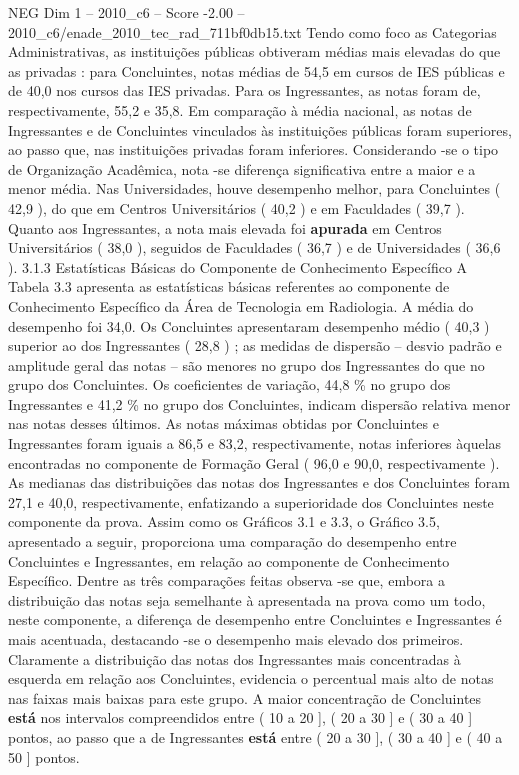 \begin{textsample}{NEG Dim 1 – 2010\_c6 – Score -2.00 – 2010\_c6/enade\_2010\_tec\_rad\_711bf0db15.txt}
Tendo como foco as Categorias Administrativas, as instituições públicas obtiveram médias mais elevadas do que as privadas : para Concluintes, notas médias de 54,5 em cursos de IES públicas e de 40,0 nos cursos das IES privadas.
Para os Ingressantes, as notas foram de, respectivamente, 55,2 e 35,8.
Em comparação à média nacional, as notas de Ingressantes e de Concluintes vinculados às instituições públicas foram superiores, ao passo que, nas instituições privadas foram inferiores.
Considerando -se o tipo de Organização Acadêmica, nota -se diferença significativa entre a maior e a menor média.
Nas Universidades, houve desempenho melhor, para Concluintes ( 42,9 ), do que em Centros Universitários ( 40,2 ) e em Faculdades ( 39,7 ).
Quanto aos Ingressantes, a nota mais elevada foi \textbf{apurada} em Centros Universitários ( 38,0 ), seguidos de Faculdades ( 36,7 ) e de Universidades ( 36,6 ). 3.1.3 Estatísticas Básicas do Componente de Conhecimento Específico A Tabela 3.3 apresenta as estatísticas básicas referentes ao componente de Conhecimento Específico da Área de Tecnologia em Radiologia.
A média do desempenho foi 34,0.
Os Concluintes apresentaram desempenho médio ( 40,3 ) superior ao dos Ingressantes ( 28,8 ) ; as medidas de dispersão – desvio padrão e amplitude geral das notas – são menores no grupo dos Ingressantes do que no grupo dos Concluintes.
Os coeficientes de variação, 44,8 \% no grupo dos Ingressantes e 41,2 \% no grupo dos Concluintes, indicam dispersão relativa menor nas notas desses últimos.
As notas máximas obtidas por Concluintes e Ingressantes foram iguais a 86,5 e 83,2, respectivamente, notas inferiores àquelas encontradas no componente de Formação Geral ( 96,0 e 90,0, respectivamente ).
As medianas das distribuições das notas dos Ingressantes e dos Concluintes foram 27,1 e 40,0, respectivamente, enfatizando a superioridade dos Concluintes neste componente da prova.
Assim como os Gráficos 3.1 e 3.3, o Gráfico 3.5, apresentado a seguir, proporciona uma comparação do desempenho entre Concluintes e Ingressantes, em relação ao componente de Conhecimento Específico.
Dentre as três comparações feitas observa -se que, embora a distribuição das notas seja semelhante à apresentada na prova como um todo, neste componente, a diferença de desempenho entre Concluintes e Ingressantes é mais acentuada, destacando -se o desempenho mais elevado dos primeiros.
Claramente a distribuição das notas dos Ingressantes mais concentradas à esquerda em relação aos Concluintes, evidencia o percentual mais alto de notas nas faixas mais baixas para este grupo.
A maior concentração de Concluintes \textbf{está} nos intervalos compreendidos entre ( 10 a 20 ], ( 20 a 30 ] e ( 30 a 40 ] pontos, ao passo que a de Ingressantes \textbf{está} entre ( 20 a 30 ], ( 30 a 40 ] e ( 40 a 50 ] pontos.

\end{textsample}
